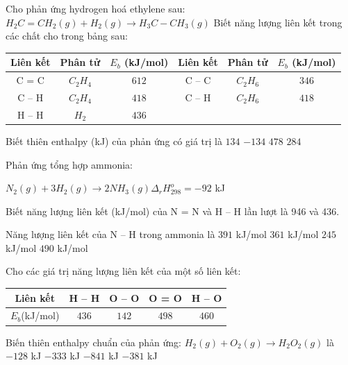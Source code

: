 \documentclass[Main.tex]{subfiles}
\begin{document}
\begin{ex} Cho phản ứng hydrogen hoá ethylene sau:
	$H_2C=CH_2(g) + H_2(g) \longrightarrow H_3C-CH_3(g)$
	Biết năng lượng liên kết trong các chất cho trong bảng sau:
	\begin{center}
		\begin{tabular}{|c|c|c|c|c|c|}
			\hline
			Liên kết & Phân tử & $E_b$ (kJ/mol) & Liên kết & Phân tử & $E_b$ (kJ/mol) \\
			\hline
			C = C & $C_2H_4$ & $612$ & C – C & $C_2H_6$ & $346$ \\
			\hline
			C – H & $C_2H_4$ & $418$ & C – H & $C_2H_6$ & $418$ \\
			\hline
			H – H & $H_2$ & $436$ &  &  &  \\
			\hline
		\end{tabular}
	\end{center}
	Biết thiên enthalpy (kJ) của phản ứng có giá trị là
	\choice
	{$134$}
	{\True $-134$}
	{$478$}
	{$284$}
\end{ex}
\begin{ex} Phản ứng tổng hợp ammonia:
	
	$N_2(g) + 3H_2(g) \longrightarrow 2NH_3(g) \Delta_r H_{298}^o = -92$ kJ
	
	Biết năng lượng liên kết (kJ/mol) của N = N và H – H lần lượt là 946 và 436.
	
	Năng lượng liên kết của N – H trong ammonia là
	\choice
	{\True $391$ kJ/mol}
	{$361$ kJ/mol}
	{$245$ kJ/mol}
	{$490$ kJ/mol}
\end{ex}

\begin{ex}Cho các giá trị năng lượng liên kết của một số liên kết:
	\begin{center}
		\begin{tabular}{|c|c|c|c|c|}
			\hline
			Liên kết & H – H & O – O & O = O & H – O \\
			\hline
			$E_b$(kJ/mol) & $436$ & $142$ & $498$ & $460$ \\
			\hline
		\end{tabular}
	\end{center}
	Biến thiên enthalpy chuẩn của phản ứng: $H_2(g) + O_2(g) \longrightarrow H_2O_2(g)$ là
	\choice
	{\True $-128$ kJ}
	{$- 333$ kJ}
	{$- 841$ kJ}
	{$-381$ kJ}
\end{ex}
\end{document}
